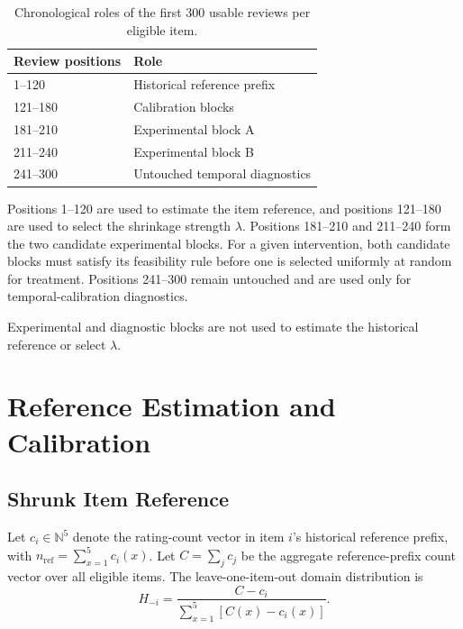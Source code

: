 \begin{table}[t]
\caption{Chronological roles of the first 300 usable reviews per eligible item.}
\label{tab:supp-amazon-splits}
\centering
\small
\begin{tabular}{@{}ll@{}}
\toprule
\textbf{Review positions} & \textbf{Role} \\
\midrule
1--120 & Historical reference prefix \\
121--180 & Calibration blocks \\
181--210 & Experimental block A \\
211--240 & Experimental block B \\
241--300 & Untouched temporal diagnostics \\
\bottomrule
\end{tabular}
\end{table}

Positions 1--120 are used to estimate the item reference, and positions
121--180 are used to select the shrinkage strength $\lambda$. Positions
181--210 and 211--240 form the two candidate experimental blocks. For a given
intervention, both candidate blocks must satisfy its feasibility rule before
one is selected uniformly at random for treatment. Positions 241--300 remain
untouched and are used only for temporal-calibration diagnostics.

Experimental and diagnostic blocks are not used to estimate the historical
reference or select $\lambda$.


\section{Reference Estimation and Calibration}
\label{sec:supp-calibration}

\subsection{Shrunk Item Reference}
\label{sec:supp-shrinkage}

Let $c_i\in\mathbb{N}^5$ denote the rating-count vector in item $i$'s
historical reference prefix, with
$n_{\mathrm{ref}}=\sum_{x=1}^{5}c_i(x)$.
Let $C=\sum_j c_j$ be the aggregate reference-prefix count vector over all
eligible items. The leave-one-item-out domain distribution is
\begin{equation}
\label{eq:supp-loo-domain}
H_{-i}
=
\frac{C-c_i}
{\sum_{x=1}^{5}[C(x)-c_i(x)]}.
\end{equation}

